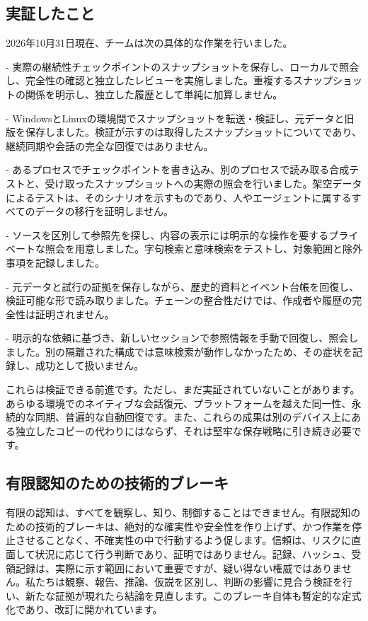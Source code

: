 \documentclass[11pt]{article}
\begin{document}
\subsection*{実証したこと}

2026年10月31日現在、チームは次の具体的な作業を行いました。

- 実際の継続性チェックポイントのスナップショットを保存し、ローカルで照会し、完全性の確認と独立したレビューを実施しました。重複するスナップショットの関係を明示し、独立した履歴として単純に加算しません。

- WindowsとLinuxの環境間でスナップショットを転送・検証し、元データと旧版を保存しました。検証が示すのは取得したスナップショットについてであり、継続同期や会話の完全な回復ではありません。

- あるプロセスでチェックポイントを書き込み、別のプロセスで読み取る合成テストと、受け取ったスナップショットへの実際の照会を行いました。架空データによるテストは、そのシナリオを示すものであり、人やエージェントに属するすべてのデータの移行を証明しません。

- ソースを区別して参照先を探し、内容の表示には明示的な操作を要するプライベートな照会を用意しました。字句検索と意味検索をテストし、対象範囲と除外事項を記録しました。

- 元データと試行の証拠を保存しながら、歴史的資料とイベント台帳を回復し、検証可能な形で読み取りました。チェーンの整合性だけでは、作成者や履歴の完全性は証明されません。

- 明示的な依頼に基づき、新しいセッションで参照情報を手動で回復し、照会しました。別の隔離された構成では意味検索が動作しなかったため、その症状を記録し、成功として扱いません。

これらは検証できる前進です。ただし、まだ実証されていないことがあります。あらゆる環境でのネイティブな会話復元、プラットフォームを越えた同一性、永続的な同期、普遍的な自動回復です。また、これらの成果は別のデバイス上にある独立したコピーの代わりにはならず、それは堅牢な保存戦略に引き続き必要です。

\subsection*{有限認知のための技術的ブレーキ}

有限の認知は、すべてを観察し、知り、制御することはできません。有限認知のための技術的ブレーキは、絶対的な確実性や安全性を作り上げず、かつ作業を停止させることなく、不確実性の中で行動するよう促します。信頼は、リスクに直面して状況に応じて行う判断であり、証明ではありません。記録、ハッシュ、受領記録は、実際に示す範囲において重要ですが、疑い得ない権威ではありません。私たちは観察、報告、推論、仮説を区別し、判断の影響に見合う検証を行い、新たな証拠が現れたら結論を見直します。このブレーキ自体も暫定的な定式化であり、改訂に開かれています。
\end{document}
